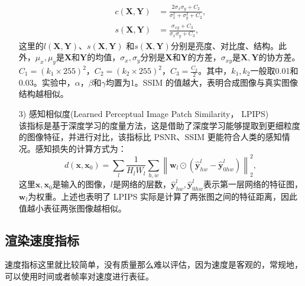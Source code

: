 \begin{enumerate}
\begin{align}
        c\left(\symbf{X}, \symbf{Y}\right) &= \frac{2\sigma_{x}\sigma_{y} + C_{2}}{\sigma_{x}^{2} + \sigma_{y}^{2} + C_{2}}, \\
        s\left(\symbf{X}, \symbf{Y}\right) &= \frac{\sigma_{xy} + C_{3}}{\sigma_{x}\sigma_{y} + C_{3}},
    \end{align}
    这里的$l\left(\symbf{X}, \symbf{Y}\right)$、$s\left(\symbf{X}, \symbf{Y}\right)$ 和$s\left(\symbf{X}, \symbf{Y}\right)$分别是亮度、对比度、结构。此外，$\mu_{x}, \mu_{y}$是$\symbf{X}$和$\symbf{Y}$的均值，$\sigma_{x},\sigma_{y}$分别是$\symbf{X}$和$\symbf{Y}$的方差，$\sigma_{xy}$是$\symbf{X}, \symbf{Y}$的协方差。$C_{1} = \left(k_{1} \times 255\right)^{2}$，$C_{2} = \left(k_{2} \times 255\right)^{2}$，$C_3 = \frac{C_2}{2}$。其中，$k_1, k_2$一般取0.01和0.03。实验中，$\alpha$，$\beta$和$\gamma$均置为1。SSIM 的值越大，表明合成图像与真实图像结构越相似。
    \item [3)]感知相似度(Learned Perceptual Image Patch Similarity， LPIPS\cite{zhang2018unreasonable}) \\
    该指标是基于深度学习的度量方法，这是借助了深度学习能够提取到更细粒度的图像特征，并进行对比，该指标比 PSNR、SSIM 更能符合人类的感知情况。感知损失的计算方式为：
    \begin{equation}
        d\left(\symbf{x}, \symbf{x}_{0}\right) = \sum_{l}\frac{1}{H_{l}W_{l}}\sum_{h, w} \left\| \symbf{w}_{l}\odot \left(\hat{\symbf{y}}_{hw}^{l} - \hat{\symbf{y}}_{0hw}^{l}\right)\right\|_{2}^{2},
    \end{equation}
    这里$\symbf{x}, \symbf{x}_{0}$是输入的图像，$l$是网络的层数，$\hat{\symbf{y}}_{hw}^{l}, \hat{\symbf{y}}_{0hw}^{l}$表示第一层网络的特征图，$\symbf{w}_{l}$为权重。上述也表明了 LPIPS 实际是计算了两张图之间的特征距离，因此值越小表征两张图像越相似。
\end{enumerate}


\subsection{渲染速度指标}
速度指标这里就比较简单，没有质量那么难以评估，因为速度是客观的，常规地，可以使用时间或者帧率对速度进行表征。


